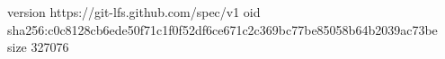 version https://git-lfs.github.com/spec/v1
oid sha256:c0c8128cb6ede50f71c1f0f52df6ce671c2c369bc77be85058b64b2039ac73be
size 327076
